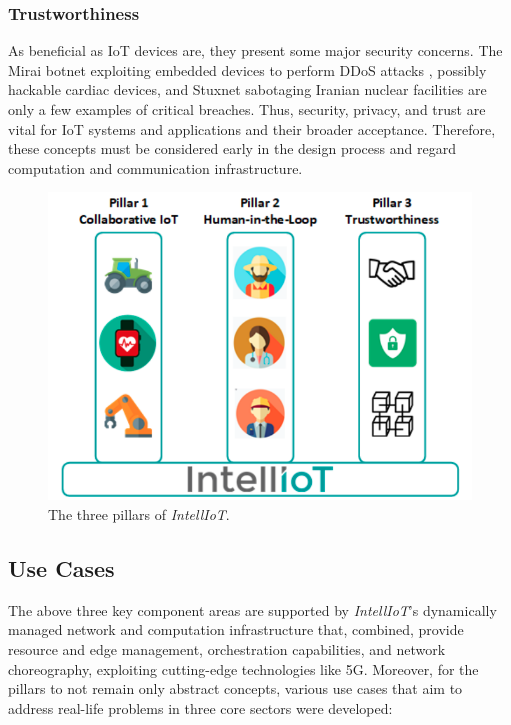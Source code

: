 \subsubsection{Trustworthiness}
As beneficial as IoT devices are, they present some major security concerns.
The Mirai botnet exploiting embedded devices to perform DDoS attacks \cite{antonakakis2017understanding}, possibly hackable cardiac devices, and Stuxnet sabotaging Iranian nuclear facilities \cite{baezner2017stuxnet} are only a few examples of critical breaches.
Thus, security, privacy, and trust are vital for IoT systems and applications and their broader acceptance.
Therefore, these concepts must be considered early in the design process and regard computation and communication infrastructure.

\begin{figure}[H]
    \centering
    \includegraphics[width=0.8\linewidth]{images/intelliot-pillars.png}
    \caption{The three pillars of \textit{IntellIoT}.}
    \label{fig:intelliot-pillars}
\end{figure}

\subsection{Use Cases}
The above three key component areas are supported by \textit{IntellIoT}'s dynamically managed network and computation infrastructure that, combined, provide resource and edge management, orchestration capabilities, and network choreography, exploiting cutting-edge technologies like 5G.
Moreover, for the pillars to not remain only abstract concepts, various use cases that aim to address real-life problems in three core sectors were developed:

